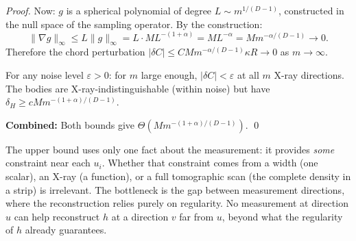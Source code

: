 \begin{proof}
Now: $g$ is a spherical polynomial of degree $L \sim m^{1/(D-1)}$, constructed in the null space of the sampling operator. By the construction:
\[
  \|\nabla g\|_\infty \leq L \|g\|_\infty = L \cdot M L^{-(1+\alpha)} = M L^{-\alpha} = M m^{-\alpha/(D-1)} \to 0.
\]
Therefore the chord perturbation $|\delta C| \leq C M m^{-\alpha/(D-1)} \kappa R \to 0$ as $m \to \infty$.

For any noise level $\varepsilon > 0$: for $m$ large enough, $|\delta C| < \varepsilon$ at all $m$ X-ray directions. The bodies are X-ray-indistinguishable (within noise) but have $\delta_H \geq cMm^{-(1+\alpha)/(D-1)}$.

\textbf{Combined:} Both bounds give $\Theta(M m^{-(1+\alpha)/(D-1)})$. \qed
\end{proof}

\begin{remark}
The upper bound uses only one fact about the measurement: it provides \emph{some} constraint near each $u_i$. Whether that constraint comes from a width (one scalar), an X-ray (a function), or a full tomographic scan (the complete density in a strip) is irrelevant. The bottleneck is the gap between measurement directions, where the reconstruction relies purely on regularity. No measurement at direction $u$ can help reconstruct $h$ at a direction $v$ far from $u$, beyond what the regularity of $h$ already guarantees.
\end{remark}
